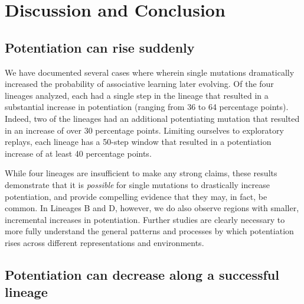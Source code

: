 \section{Discussion and Conclusion}

\subsection{Potentiation can rise suddenly}

We have documented several cases where wherein single mutations dramatically increased the probability of associative learning later evolving.%
Of the four lineages analyzed, each had a single step in the lineage that resulted in a substantial increase in potentiation (ranging from 36 to 64 percentage points). 
Indeed, two of the lineages had an additional potentiating mutation that resulted in an increase of over 30 percentage points.
Limiting ourselves to exploratory replays, each lineage has a 50-step window that resulted in a potentiation increase of at least 40 percentage points.

While four lineages are insufficient to make any strong claims, these results demonstrate that it is \textit{possible} for single mutations to drastically increase potentiation, and provide compelling evidence that they may, in fact, be common. 
In Lineages B and D, however, we do also observe regions with smaller, incremental increases in potentiation.
Further studies are clearly necessary to more fully understand the general patterns and processes by which potentiation rises across different representations and environments.


\subsection{Potentiation can decrease along a successful lineage}

